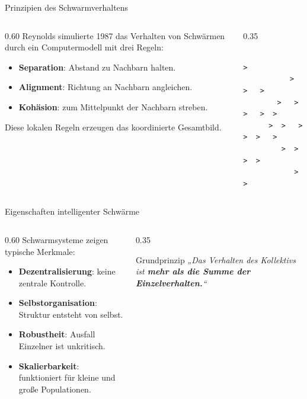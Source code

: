 \begin{frame}[fragile]{Prinzipien des Schwarmverhaltens}
\begin{columns}
\begin{column}{0.60\textwidth}
Reynolds simulierte 1987 das Verhalten von Schwärmen durch ein Computermodell mit drei Regeln:
\begin{itemize}
\item \textbf{Separation}: Abstand zu Nachbarn halten.
\item \textbf{Alignment}: Richtung an Nachbarn angleichen.
\item \textbf{Kohäsion}: zum Mittelpunkt der Nachbarn streben.
\end{itemize}
Diese lokalen Regeln erzeugen das koordinierte Gesamtbild.
\end{column}
\begin{column}{0.35\textwidth}
\begin{verbatim}
                >
           >  >   >
        >   >  >   >  >
      >  >   >  >  >   >
         >  >   >  >
            >   >
\end{verbatim}
\end{column}
\end{columns}
\end{frame}

\begin{frame}{Eigenschaften intelligenter Schwärme}
\begin{columns}
\begin{column}{0.60\textwidth}
Schwarmsysteme zeigen typische Merkmale:
\begin{itemize}
\item \textbf{Dezentralisierung}: keine zentrale Kontrolle.
\item \textbf{Selbstorganisation}: Struktur entsteht von selbst.
\item \textbf{Robustheit}: Ausfall Einzelner ist unkritisch.
\item \textbf{Skalierbarkeit}: funktioniert für kleine und große Populationen.
\end{itemize}
\end{column}
\begin{column}{0.35\textwidth}
\begin{blockC2}{Grundprinzip}
\centering
\large
\itshape
„Das Verhalten des Kollektivs ist \textbf{mehr als die Summe der Einzelverhalten.}“
\end{blockC2}
\end{column}
\end{columns}
\end{frame}

